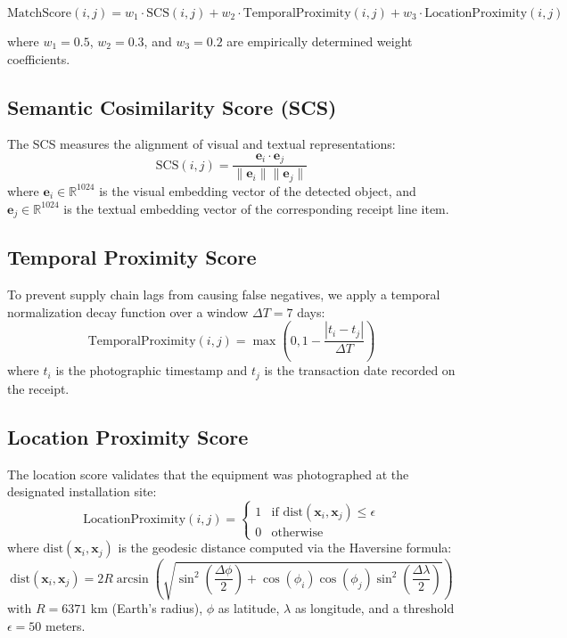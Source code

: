 \documentclass[11pt,letterpaper]{report}
\begin{document}
\[
\text{MatchScore}(i,j) = w_1 \cdot \text{SCS}(i,j) + w_2 \cdot \text{TemporalProximity}(i,j) + w_3 \cdot \text{LocationProximity}(i,j)
\]

where $w_1 = 0.5$, $w_2 = 0.3$, and $w_3 = 0.2$ are empirically determined weight coefficients.

\subsection*{Semantic Cosimilarity Score (SCS)}
The SCS measures the alignment of visual and textual representations:
\[
\text{SCS}(i,j) = \frac{\mathbf{e}_i \cdot \mathbf{e}_j}{\|\mathbf{e}_i\| \|\mathbf{e}_j\|}
\]
where $\mathbf{e}_i \in \mathbb{R}^{1024}$ is the visual embedding vector of the detected object, and $\mathbf{e}_j \in \mathbb{R}^{1024}$ is the textual embedding vector of the corresponding receipt line item.

\subsection*{Temporal Proximity Score}
To prevent supply chain lags from causing false negatives, we apply a temporal normalization decay function over a window $\Delta T = 7$ days:
\[
\text{TemporalProximity}(i,j) = \max\left(0, 1 - \frac{|t_i - t_j|}{\Delta T}\right)
\]
where $t_i$ is the photographic timestamp and $t_j$ is the transaction date recorded on the receipt.

\subsection*{Location Proximity Score}
The location score validates that the equipment was photographed at the designated installation site:
\[
\text{LocationProximity}(i,j) = \begin{cases} 
  1 & \text{if } \text{dist}(\mathbf{x}_i, \mathbf{x}_j) \le \epsilon \\
  0 & \text{otherwise}
\end{cases}
\]
where $\text{dist}(\mathbf{x}_i, \mathbf{x}_j)$ is the geodesic distance computed via the Haversine formula:
\[
\text{dist}(\mathbf{x}_i, \mathbf{x}_j) = 2 R \arcsin\left(\sqrt{\sin^2\left(\frac{\Delta \phi}{2}\right) + \cos(\phi_i)\cos(\phi_j)\sin^2\left(\frac{\Delta \lambda}{2}\right)}\right)
\]
with $R = 6371$ km (Earth's radius), $\phi$ as latitude, $\lambda$ as longitude, and a threshold $\epsilon = 50$ meters.
\end{document}
